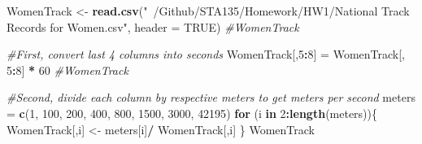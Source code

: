 \documentclass[
]{article}
\newenvironment{Shaded}{\begin{snugshade}}{\end{snugshade}}
\newcommand{\CommentTok}[1]{\textcolor[rgb]{0.56,0.35,0.01}{\textit{#1}}}
\newcommand{\ControlFlowTok}[1]{\textcolor[rgb]{0.13,0.29,0.53}{\textbf{#1}}}
\newcommand{\DataTypeTok}[1]{\textcolor[rgb]{0.13,0.29,0.53}{#1}}
\newcommand{\DecValTok}[1]{\textcolor[rgb]{0.00,0.00,0.81}{#1}}
\newcommand{\KeywordTok}[1]{\textcolor[rgb]{0.13,0.29,0.53}{\textbf{#1}}}
\newcommand{\NormalTok}[1]{#1}
\newcommand{\OperatorTok}[1]{\textcolor[rgb]{0.81,0.36,0.00}{\textbf{#1}}}
\newcommand{\OtherTok}[1]{\textcolor[rgb]{0.56,0.35,0.01}{#1}}
\newcommand{\StringTok}[1]{\textcolor[rgb]{0.31,0.60,0.02}{#1}}
\begin{document}
\begin{Shaded}
\begin{Highlighting}[]
\NormalTok{WomenTrack <-}\StringTok{ }\KeywordTok{read.csv}\NormalTok{(}\StringTok{"~/Github/STA135/Homework/HW1/National Track Records for Women.csv"}\NormalTok{, }\DataTypeTok{header =}  \OtherTok{TRUE}\NormalTok{)}
\CommentTok{#WomenTrack}

\CommentTok{#First, convert last 4 columns into seconds }
\NormalTok{WomenTrack[,}\DecValTok{5}\OperatorTok{:}\DecValTok{8}\NormalTok{] =}\StringTok{ }\NormalTok{WomenTrack[, }\DecValTok{5}\OperatorTok{:}\DecValTok{8}\NormalTok{] }\OperatorTok{*}\StringTok{ }\DecValTok{60}
\CommentTok{#WomenTrack}

\CommentTok{#Second, divide each column by respective meters to get meters per second}
\NormalTok{meters =}\StringTok{ }\KeywordTok{c}\NormalTok{(}\DecValTok{1}\NormalTok{, }\DecValTok{100}\NormalTok{, }\DecValTok{200}\NormalTok{, }\DecValTok{400}\NormalTok{, }\DecValTok{800}\NormalTok{, }\DecValTok{1500}\NormalTok{, }\DecValTok{3000}\NormalTok{, }\DecValTok{42195}\NormalTok{)}
\ControlFlowTok{for}\NormalTok{ (i }\ControlFlowTok{in} \DecValTok{2}\OperatorTok{:}\KeywordTok{length}\NormalTok{(meters))\{}
\NormalTok{  WomenTrack[,i] <-}\StringTok{ }\NormalTok{meters[i]}\OperatorTok{/}\StringTok{ }\NormalTok{WomenTrack[,i]}
\NormalTok{\}}
\NormalTok{WomenTrack}
\end{Highlighting}
\end{Shaded}
\end{document}
